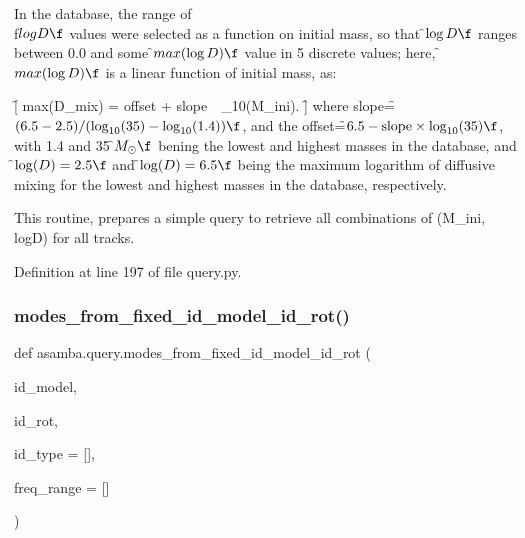 \begin{DoxyVerb}In the database, the range of \\f$log D\f$ values were selected as a function on initial mass, so that 
\f$\log D\f$ ranges between 0.0 and some \f$max(\log D)\f$ value in 5 discrete values; here, 
\f$ max(\log D)\f$ is a linear function of initial mass, as:

\f[ max(\log D_{\rm mix}) = \rm{offset} + \rm{slope}\, \times\, \log_{10}(M_{\rm ini}). 
\f]
where slope=\f$(6.5 - 2.5)/(\log_{10}(35) - \log_{10}(1.4))\f$, and the 
offset=\f$6.5-{\rm slope}\times\log_{10}(35)\f$, with 1.4 and 35 \f$M_{\odot}\f$ bening the lowest
and highest masses in the database, and \f$\log(D)=2.5\f$ and \f$\log(D)=6.5\f$ being the maximum logarithm
of diffusive mixing for the lowest and highest masses in the database, respectively.

This routine, prepares a simple query to retrieve all combinations of (M_ini, logD) for all tracks.
\end{DoxyVerb}
 

Definition at line 197 of file query.\+py.

\mbox{\label{namespaceasamba_1_1query_abf11bd8e57ec89894fb8b23bef226d1d}} 
\subsubsection{\texorpdfstring{modes\+\_\+from\+\_\+fixed\+\_\+id\+\_\+model\+\_\+id\+\_\+rot()}{modes\_from\_fixed\_id\_model\_id\_rot()}}
{\footnotesize\ttfamily def asamba.\+query.\+modes\+\_\+from\+\_\+fixed\+\_\+id\+\_\+model\+\_\+id\+\_\+rot (\begin{DoxyParamCaption}\item[{}]{id\+\_\+model,  }\item[{}]{id\+\_\+rot,  }\item[{}]{id\+\_\+type = {\ttfamily \mbox{[}\mbox{]}},  }\item[{}]{freq\+\_\+range = {\ttfamily \mbox{[}\mbox{]}} }\end{DoxyParamCaption})}

